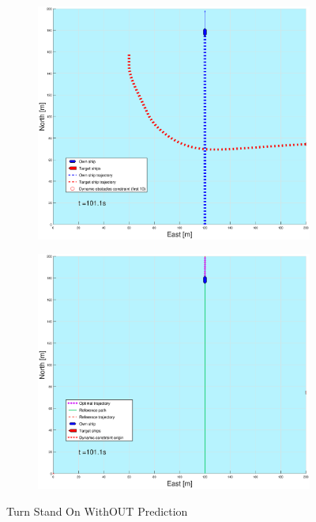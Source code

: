\begin{figure}[ht]
\begin{subfigure}[b]{0.499\textwidth}
    \end{subfigure}
    \hfill
    \\
    \begin{subfigure}[b]{0.49\textwidth}
        \centering
        \includegraphics[width=\textwidth]{Images/Figures/sving_SO/_Simple_1fig1_time=101}
    \end{subfigure}
    \hfill
    \begin{subfigure}[b]{0.499\textwidth}
        \centering
        \includegraphics[width=\textwidth]{Images/Figures/sving_SO/_Simple_1fig999_time=101}
    \end{subfigure}
    \hfill
    \caption{Turn Stand On WithOUT Prediction}
\end{figure}

